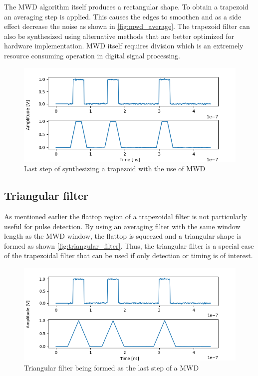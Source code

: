 The MWD algorithm itself produces a rectangular shape. To obtain a trapezoid
an averaging step is applied. This causes the edges to smoothen and as a 
side effect decrease the noise as shown in \autoref{fig:mwd_average}.
The trapezoid filter can also be synthesized using
alternative methods that are better optimized for hardware implementation.
MWD itself requires division which is an extremely resource consuming operation 
in digital signal processing.

\begin{figure}[H]
  \centering
  \includegraphics[width=\linewidth]{media/mwd_average.png}
  \caption{Last step of synthesizing a trapezoid with the use of MWD}
  \label{fig:mwd_average} 
\end{figure}

\subsection{Triangular filter}

As mentioned earlier the flattop region of a trapezoidal filter
is not particularly useful for pulse detection. By using an 
averaging filter with the same window length as the MWD window, 
the flattop is squeezed and a triangular shape is formed
as shown \autoref{fig:triangular_filter}.
Thus, the triangular filter is a special case of the 
trapezoidal filter that can be used if only detection or timing is of interest.

\begin{figure}[H]
  \centering
  \includegraphics[width=\linewidth]{media/triangular_filter.png}
  \caption{Triangular filter being formed as the last step of a MWD}
  \label{fig:triangular_filter} 
\end{figure}

